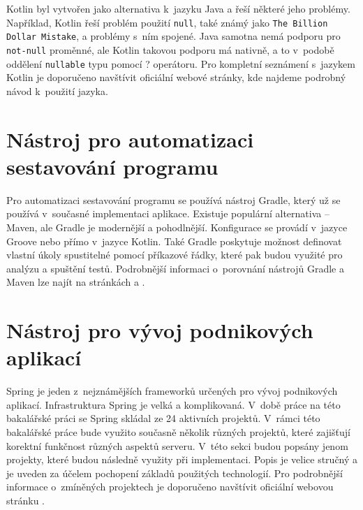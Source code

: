     
    Kotlin byl vytvořen jako alternativa k~jazyku Java a řeší některé jeho problémy. Například, Kotlin řeší problém použití \texttt{null}, také známý jako \texttt{The Billion Dollar Mistake}, a problémy s~ním spojené. Java samotna nemá podporu pro \texttt{not-null} proměnné, ale Kotlin takovou podporu má nativně, a to v~podobě oddělení \texttt{nullable} typu pomocí ? operátoru. Pro kompletní seznámení s~jazykem Kotlin je doporučeno navštívit oficiální webové stránky, kde najdeme podrobný návod k~použití jazyka.\cite{kotlin-documentation}
    

\section{Nástroj pro automatizaci sestavování programu}\label{resere:build}
    Pro automatizaci sestavování programu se používá nástroj Gradle, který už se používá v~současné implementaci aplikace. Existuje populární alternativa -- Maven, ale Gradle je modernější a pohodlnější. Konfigurace se provádí v~jazyce Groove nebo přímo v~jazyce Kotlin. Také Gradle poskytuje možnost definovat vlastní úkoly spustitelné pomocí příkazové řádky, které pak budou využité pro analýzu a spuštění testů. Podrobnější informaci o~porovnání nástrojů Gradle a Maven lze najít na stránkách \cite{grale-vs-mavem} a \cite{gradle-vs-maven-bealdung}.

\section{Nástroj pro vývoj podnikových aplikací}\label{resere:j2ee}
    Spring je jeden z~nejznámějších frameworků určených pro vývoj podnikových aplikací. Infrastruktura Spring je velká a komplikovaná. V~době práce na této bakalářské práci se Spring skládal ze 24 aktivních projektů. V~rámci této bakalářské práce bude využito současně několik různých projektů, které zajišťují korektní funkčnost různých aspektů serveru. V~této sekci budou popsány jenom projekty, které budou následně využity při implementaci. Popis je velice stručný a je uveden za účelem pochopení základů použitých technologií. Pro podrobnější informace o~zmíněných projektech je doporučeno navštívit oficiální webovou stránku \cite{spring-projects}.
    
